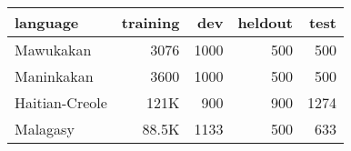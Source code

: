 
\begin{tabular}{lrrrr}
\toprule
language & training & dev & heldout & test \\
\toprule
Mawukakan & 3076 & 1000 & 500 & 500 \\
Maninkakan & 3600 & 1000 & 500 & 500 \\
Haitian-Creole & 121K & 900 & 900 & 1274 \\
Malagasy & 88.5K & 1133 & 500 & 633 \\
\bottomrule
\end{tabular}

